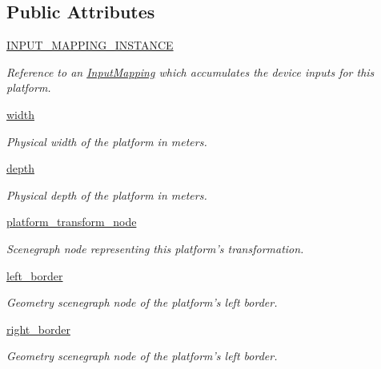 \subsection*{\-Public \-Attributes}
\begin{DoxyCompactItemize}
\item 
\hyperlink{classlib_1_1Platform_1_1Platform_ac6bd73837edc0be9076519439f499c46}{\-I\-N\-P\-U\-T\-\_\-\-M\-A\-P\-P\-I\-N\-G\-\_\-\-I\-N\-S\-T\-A\-N\-C\-E}
\begin{DoxyCompactList}\small\item\em \-Reference to an \hyperlink{namespacelib_1_1InputMapping}{\-Input\-Mapping} which accumulates the device inputs for this platform. \end{DoxyCompactList}\item 
\hyperlink{classlib_1_1Platform_1_1Platform_a392651bfee95e64e072230754d4c9083}{width}
\begin{DoxyCompactList}\small\item\em \-Physical width of the platform in meters. \end{DoxyCompactList}\item 
\hyperlink{classlib_1_1Platform_1_1Platform_a978c338efc0b8e99e11c4deff44c5d00}{depth}
\begin{DoxyCompactList}\small\item\em \-Physical depth of the platform in meters. \end{DoxyCompactList}\item 
\hyperlink{classlib_1_1Platform_1_1Platform_a949a2b1738c014977c83fd387a35b787}{platform\-\_\-transform\-\_\-node}
\begin{DoxyCompactList}\small\item\em \-Scenegraph node representing this platform's transformation. \end{DoxyCompactList}\item 
\hyperlink{classlib_1_1Platform_1_1Platform_a9656a61193978079211dcc5376abace3}{left\-\_\-border}
\begin{DoxyCompactList}\small\item\em \-Geometry scenegraph node of the platform's left border. \end{DoxyCompactList}\item 
\hyperlink{classlib_1_1Platform_1_1Platform_a14d85ca2cdfe53e7b5ae66661b0ab7fa}{right\-\_\-border}
\begin{DoxyCompactList}\small\item\em \-Geometry scenegraph node of the platform's left border. \end{DoxyCompactList}\item 

\end{DoxyCompactItemize}
